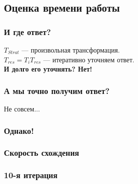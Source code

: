 \documentclass{beamer}
\begin{document}
\subsection{Оценка времени работы}

\begin{frame}
\frametitle{И где ответ?}
	$T_{Strat}$ --- произвольная трансформация.\\
	$T_{res} = T_i T_{res}$ --- итеративно уточняем ответ.\\
	\textbf{И долго его уточнять? Нет!}\\

\end{frame}


\begin{frame}
	\frametitle{А мы точно получим ответ?}
	Не совсем...
	
\end{frame}


\begin{frame}
	\frametitle{Однако!}
	
\end{frame}


\begin{frame}
	\frametitle{Скорость схождения}
	
\end{frame}


\begin{frame}
	\frametitle{10-я итерация}
	
\end{frame}

\end{document}
